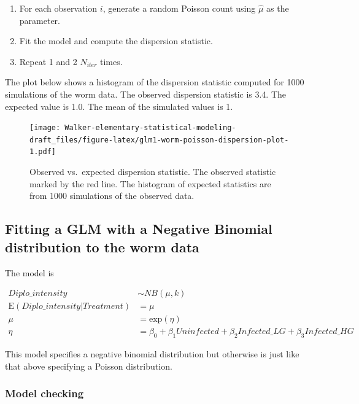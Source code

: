 \documentclass[]{book}
\providecommand{\tightlist}{%
  \setlength{\itemsep}{0pt}\setlength{\parskip}{0pt}}
\begin{document}
\begin{enumerate}
\def\labelenumi{\arabic{enumi}.}
\tightlist
\item
  For each observation \(i\), generate a random Poisson count using \(\hat{\mu}\) as the parameter.
\item
  Fit the model and compute the dispersion statistic.
\item
  Repeat 1 and 2 \(N_{iter}\) times.
\end{enumerate}

The plot below shows a histogram of the dispersion statistic computed for 1000 simulations of the worm data. The observed dispersion statistic is 3.4. The expected value is 1.0. The mean of the simulated values is 1.

\begin{figure}
\centering
\texttt{[image: Walker-elementary-statistical-modeling-draft\_files/figure-latex/glm1-worm-poisson-dispersion-plot-1.pdf]}
\caption{\label{fig:glm1-worm-poisson-dispersion-plot}Observed vs.~expected dispersion statistic. The observed statistic marked by the red line. The histogram of expected statistics are from 1000 simulations of the observed data.}
\end{figure}

\hypertarget{fitting-a-glm-with-a-negative-binomial-distribution-to-the-worm-data}{%
\subsection{Fitting a GLM with a Negative Binomial distribution to the worm data}\label{fitting-a-glm-with-a-negative-binomial-distribution-to-the-worm-data}}

The model is

\begin{align}
Diplo\_intensity &\sim NB(\mu, k)\\
\mathrm{E}({Diplo\_intensity|Treatment}) &= \mu\\
\mu &= \mathrm{exp}(\eta)\\
\eta &= \beta_0 + \beta_1 Uninfected + \beta_2 Infected\_LG + \beta_3 Infected\_HG
\end{align}

This model specifies a negative binomial distribution but otherwise is just like that above specifying a Poisson distribution.

\hypertarget{model-checking-1}{%
\subsubsection{Model checking}\label{model-checking-1}}
\end{document}
